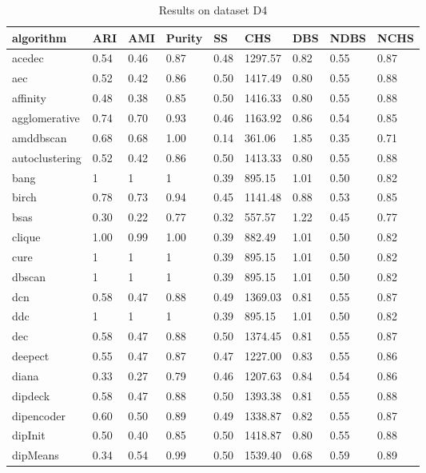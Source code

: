 \begin{table}[H]
\centering
\caption{Results on dataset D4}
\label{S57_Table}
\begin{tabular}{|l|l|l|l|l|l|l|l|l|}
\hline
algorithm & ARI & AMI & Purity & SS & CHS & DBS & NDBS & NCHS \\
\hline
acedec & 0.54 & 0.46 & 0.87 & 0.48 & 1297.57 & 0.82 & 0.55 & 0.87 \\
\hline
aec & 0.52 & 0.42 & 0.86 & 0.50 & 1417.49 & 0.80 & 0.55 & 0.88 \\
\hline
affinity & 0.48 & 0.38 & 0.85 & 0.50 & 1416.33 & 0.80 & 0.55 & 0.88 \\
\hline
agglomerative & 0.74 & 0.70 & 0.93 & 0.46 & 1163.92 & 0.86 & 0.54 & 0.85 \\
\hline
amddbscan & 0.68 & 0.68 & 1.00 & 0.14 & 361.06 & 1.85 & 0.35 & 0.71 \\
\hline
autoclustering & 0.52 & 0.42 & 0.86 & 0.50 & 1413.33 & 0.80 & 0.55 & 0.88 \\
\hline
bang & 1 & 1 & 1 & 0.39 & 895.15 & 1.01 & 0.50 & 0.82 \\
\hline
birch & 0.78 & 0.73 & 0.94 & 0.45 & 1141.48 & 0.88 & 0.53 & 0.85 \\
\hline
bsas & 0.30 & 0.22 & 0.77 & 0.32 & 557.57 & 1.22 & 0.45 & 0.77 \\
\hline
clique & 1.00 & 0.99 & 1.00 & 0.39 & 882.49 & 1.01 & 0.50 & 0.82 \\
\hline
cure & 1 & 1 & 1 & 0.39 & 895.15 & 1.01 & 0.50 & 0.82 \\
\hline
dbscan & 1 & 1 & 1 & 0.39 & 895.15 & 1.01 & 0.50 & 0.82 \\
\hline
dcn & 0.58 & 0.47 & 0.88 & 0.49 & 1369.03 & 0.81 & 0.55 & 0.87 \\
\hline
ddc & 1 & 1 & 1 & 0.39 & 895.15 & 1.01 & 0.50 & 0.82 \\
\hline
dec & 0.58 & 0.47 & 0.88 & 0.50 & 1374.45 & 0.81 & 0.55 & 0.87 \\
\hline
deepect & 0.55 & 0.47 & 0.87 & 0.47 & 1227.00 & 0.83 & 0.55 & 0.86 \\
\hline
diana & 0.33 & 0.27 & 0.79 & 0.46 & 1207.63 & 0.84 & 0.54 & 0.86 \\
\hline
dipdeck & 0.58 & 0.47 & 0.88 & 0.50 & 1393.38 & 0.81 & 0.55 & 0.88 \\
\hline
dipencoder & 0.60 & 0.50 & 0.89 & 0.49 & 1338.87 & 0.82 & 0.55 & 0.87 \\
\hline
dipInit & 0.50 & 0.40 & 0.85 & 0.50 & 1418.87 & 0.80 & 0.55 & 0.88 \\
\hline
dipMeans & 0.34 & 0.54 & 0.99 & 0.50 & 1539.40 & 0.68 & 0.59 & 0.89 \\

\end{tabular}
\end{table}
